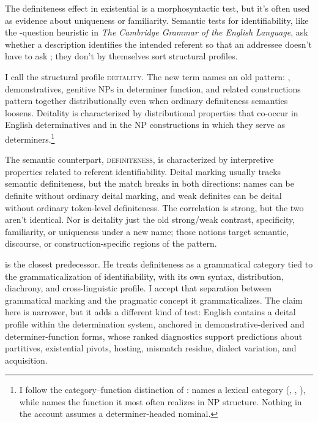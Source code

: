 \documentclass[12pt,letterpaper]{article}
\newcommand{\Deitality}{\textsc{deitality}}
\newcommand{\Definiteness}{\textsc{definiteness}}
\begin{document}
The definiteness effect in existential  \parencite{milsark1977,McNally2011} is a morphosyntactic test, but it's often used as evidence about uniqueness or familiarity. Semantic tests for identifiability, like the -question heuristic in \emph{The Cambridge Grammar of the English Language}, ask whether a description identifies the intended referent so that an addressee doesn't have to ask  \parencite{HuddlestonPullum2002}; they don't by themselves sort structural profiles.

I call the structural profile \Deitality{}. The new term names an old pattern: , demonstratives, genitive NPs in determiner function, and related constructions pattern together distributionally even when ordinary definiteness semantics loosens. Deitality is characterized by distributional properties that co-occur in English determinatives and in the NP constructions in which they serve as determiners.\footnote{I follow the category--function distinction of \textcite{HuddlestonPullum2002}:  names a lexical category (, , ), while  names the function it most often realizes in NP structure. Nothing in the account assumes a determiner-headed nominal.}

The semantic counterpart, \Definiteness{}, is characterized by interpretive properties related to referent identifiability. Deital marking usually tracks semantic definiteness, but the match breaks in both directions: names can be definite without ordinary deital marking, and weak definites can be deital without ordinary token-level definiteness. The correlation is strong, but the two aren't identical. Nor is deitality just the old strong/weak contrast, specificity, familiarity, or uniqueness under a new name; those notions target semantic, discourse, or construction-specific regions of the pattern.

\textcite{lyons1999} is the closest predecessor. He treats definiteness as a grammatical category tied to the grammaticalization of identifiability, with its own syntax, distribution, diachrony, and cross-linguistic profile. I accept that separation between grammatical marking and the pragmatic concept it grammaticalizes. The claim here is narrower, but it adds a different kind of test: English contains a deital profile within the determination system, anchored in demonstrative-derived and determiner-function forms, whose ranked diagnostics support predictions about partitives, existential pivots, hosting, mismatch residue, dialect variation, and acquisition.
\end{document}
